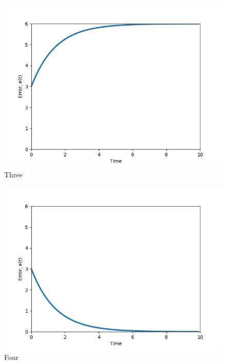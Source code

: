 \begin{enumerate}
\begin{figure}[!htb]
\label{Openloop}
\end{figure}
\begin{figure}[!htb]
\begin{center}
\includegraphics[scale=0.280]{img/lateral_control/error_incorrect1.png}
\end{center}
\caption{Three}
\label{Openloop}
\end{figure}
\begin{figure}[!htb]
\begin{center}
\includegraphics[scale=0.280]{img/lateral_control/error_correct.png}
\end{center}
\caption{Four}
\label{Openloop}
\end{figure}


\end{enumerate}

